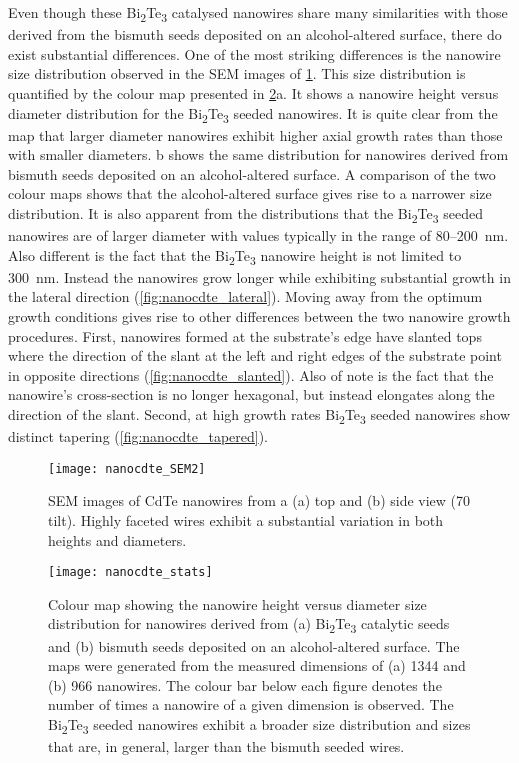 Even though these Bi\textsubscript{2}Te\textsubscript{3} catalysed nanowires share many similarities with those derived from the bismuth seeds deposited on an alcohol-altered surface, there do exist substantial differences.
One of the most striking differences is the nanowire size distribution observed in the SEM images of \cref{fig:nanocdte_SEM2}.
This size distribution is quantified by the colour map presented in \cref{fig:nanocdte_stats}a.
It shows a nanowire height versus diameter distribution for the Bi\textsubscript{2}Te\textsubscript{3} seeded nanowires.
It is quite clear from the map that larger diameter nanowires exhibit higher axial growth rates than those with smaller diameters.
b shows the same distribution for nanowires derived from bismuth seeds deposited on an alcohol-altered surface.
A comparison of the two colour maps shows that the alcohol-altered surface gives rise to a narrower size distribution.
It is also apparent from the distributions that the Bi\textsubscript{2}Te\textsubscript{3} seeded nanowires are of larger diameter with values typically in the range of 80--200~nm.
Also different is the fact that the Bi\textsubscript{2}Te\textsubscript{3} nanowire height is not limited to 300~nm.
Instead the nanowires grow longer while exhibiting substantial growth in the lateral direction (\cref{fig:nanocdte_lateral}).
Moving away from the optimum growth conditions gives rise to other differences between the two nanowire growth procedures.
First, nanowires formed at the substrate's edge have slanted tops where the direction of the slant at the left and right edges of the substrate point in opposite directions (\cref{fig:nanocdte_slanted}).
Also of note is the fact that the nanowire's cross-section is no longer hexagonal, but instead elongates along the direction of the slant.
Second, at high growth rates Bi\textsubscript{2}Te\textsubscript{3} seeded nanowires show distinct tapering (\cref{fig:nanocdte_tapered}).
\begin{figure}
 \centering \texttt{[image: nanocdte\_SEM2]}
 \caption[SEM image of CdTe nanowires]{\label{fig:nanocdte_SEM2}SEM images of CdTe nanowires from a (a) top and (b) side view (70\degree{} tilt).
  Highly faceted wires exhibit a substantial variation in both heights and diameters.}
\end{figure}
\begin{figure}
 \centering \texttt{[image: nanocdte\_stats]}
 \caption[CdTe nanowire dimension colourmap]{\label{fig:nanocdte_stats}Colour map showing the nanowire height versus diameter size distribution for nanowires derived from (a) Bi\textsubscript{2}Te\textsubscript{3} catalytic seeds and (b) bismuth seeds deposited on an alcohol-altered surface.
  The maps were generated from the measured dimensions of (a) 1344 and (b) 966 nanowires.
  The colour bar below each figure denotes the number of times a nanowire of a given dimension is observed.
  The Bi\textsubscript{2}Te\textsubscript{3} seeded nanowires exhibit a broader size distribution and sizes that are, in general, larger than the bismuth seeded wires.}
\end{figure}
